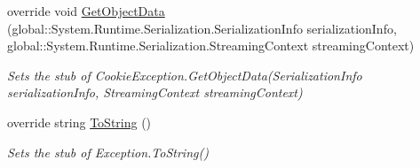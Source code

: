 \begin{DoxyCompactItemize}
override void \hyperlink{class_system_1_1_net_1_1_fakes_1_1_stub_cookie_exception_a593ccca2bc42781f31731d76f5c0368d}{Get\-Object\-Data} (global\-::\-System.\-Runtime.\-Serialization.\-Serialization\-Info serialization\-Info, global\-::\-System.\-Runtime.\-Serialization.\-Streaming\-Context streaming\-Context)
\begin{DoxyCompactList}\small\item\em Sets the stub of Cookie\-Exception.\-Get\-Object\-Data(\-Serialization\-Info serialization\-Info, Streaming\-Context streaming\-Context)\end{DoxyCompactList}\item 
override string \hyperlink{class_system_1_1_net_1_1_fakes_1_1_stub_cookie_exception_a56ca7bf3b5296c7b988066179a00b4c8}{To\-String} ()
\begin{DoxyCompactList}\small\item\em Sets the stub of Exception.\-To\-String()\end{DoxyCompactList}\end{DoxyCompactItemize}
